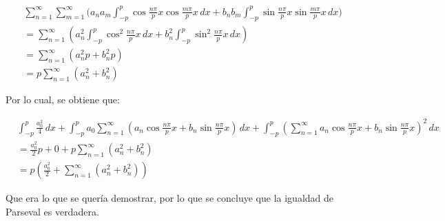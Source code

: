 \documentclass[12pt,a4paper]{article}
\begin{document}
\begin{align*}
&\sum_{n=1}^{\infty} \sum_{m=1}^{\infty} \Bigg(a_n a_m \int_{-p}^{p} \cos \frac{n\pi}{p}x \cos \frac{m\pi}{p}x \, dx + b_n b_m \int_{-p}^{p} \sin \frac{n\pi}{p}x \sin \frac{m\pi}{p}x\, dx\Bigg) 
\\&= \sum_{n=1}^{\infty} \left(a_n^2 \int_{-p}^{p} \cos^2 \frac{n\pi}{p}x \, dx + b_n^2 \int_{-p}^{p} \sin^2 \frac{n\pi}{p}x\, dx\right)
\\&= \sum_{n=1}^{\infty} \left(a_n^2 p + b_n^2 p\right) 
\\&= p \sum_{n=1}^{\infty} (a_n^2 + b_n^2)
\end{align*}

Por lo cual, se obtiene que:

\begin{align*}
&\int_{-p}^{p} \frac{a_0^2}{4} \, dx + \int_{-p}^{p} a_0\sum_{n=1}^{\infty} \left(a_n \cos \frac{n\pi}{p}x + b_n \sin \frac{n\pi}{p}x \right) \, dx + \int_{-p}^{p} \left(\sum_{n=1}^{\infty} a_n \cos \frac{n\pi}{p}x + b_n \sin \frac{n\pi}{p}x \right)^2 \, dx\\
&= \frac{a_0^2}{2} p + 0 + p \sum_{n=1}^{\infty} (a_n^2 + b_n^2)\\
&= p\left(\frac{a_0^2}{2} + \sum_{n=1}^{\infty} (a_n^2 + b_n^2)\right)
\end{align*}

Que era lo que se quería demostrar, por lo que se concluye que la igualdad de Parseval es verdadera.
\end{document}
